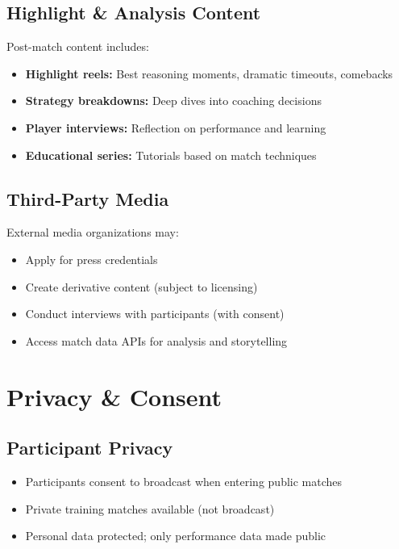 \subsection{Highlight \& Analysis Content}

Post-match content includes:
\begin{itemize}[leftmargin=*]
  \item \textbf{Highlight reels:} Best reasoning moments, dramatic timeouts, comebacks
  \item \textbf{Strategy breakdowns:} Deep dives into coaching decisions
  \item \textbf{Player interviews:} Reflection on performance and learning
  \item \textbf{Educational series:} Tutorials based on match techniques
\end{itemize}

\subsection{Third-Party Media}

External media organizations may:
\begin{itemize}[leftmargin=*]
  \item Apply for press credentials
  \item Create derivative content (subject to licensing)
  \item Conduct interviews with participants (with consent)
  \item Access match data APIs for analysis and storytelling
\end{itemize}

\section{Privacy \& Consent}

\subsection{Participant Privacy}

\begin{itemize}[leftmargin=*]
  \item Participants consent to broadcast when entering public matches
  \item Private training matches available (not broadcast)
  \item Personal data protected; only performance data made public
\end{itemize}

